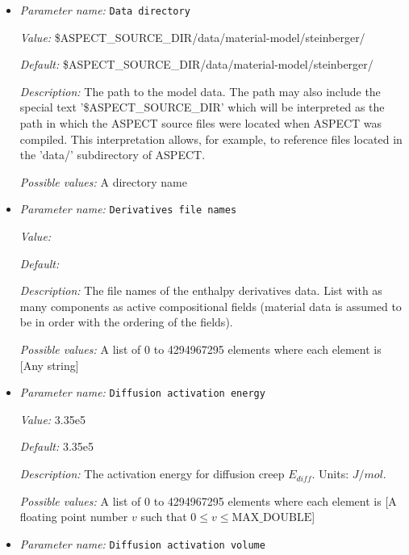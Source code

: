 \begin{itemize}
{\it Possible values:} A boolean value (true or false)
\item {\it Parameter name:} {\tt Data directory}
\label{parameters:Material model/Grain size model/Data directory}


{\it Value:} \$ASPECT\_SOURCE\_DIR/data/material-model/steinberger/


{\it Default:} \$ASPECT\_SOURCE\_DIR/data/material-model/steinberger/


{\it Description:} The path to the model data. The path may also include the special text '\$ASPECT\_SOURCE\_DIR' which will be interpreted as the path in which the ASPECT source files were located when ASPECT was compiled. This interpretation allows, for example, to reference files located in the 'data/' subdirectory of ASPECT. 


{\it Possible values:} A directory name
\item {\it Parameter name:} {\tt Derivatives file names}
\label{parameters:Material model/Grain size model/Derivatives file names}


{\it Value:} 


{\it Default:} 


{\it Description:} The file names of the enthalpy derivatives data. List with as many components as active compositional fields (material data is assumed to be in order with the ordering of the fields). 


{\it Possible values:} A list of 0 to 4294967295 elements where each element is [Any string]
\item {\it Parameter name:} {\tt Diffusion activation energy}
\label{parameters:Material model/Grain size model/Diffusion activation energy}


{\it Value:} 3.35e5


{\it Default:} 3.35e5


{\it Description:} The activation energy for diffusion creep $E_{diff}$. Units: $J/mol$.


{\it Possible values:} A list of 0 to 4294967295 elements where each element is [A floating point number $v$ such that $0 \leq v \leq \text{MAX\_DOUBLE}$]
\item {\it Parameter name:} {\tt Diffusion activation volume}
\label{parameters:Material model/Grain size model/Diffusion activation volume}



\end{itemize}
